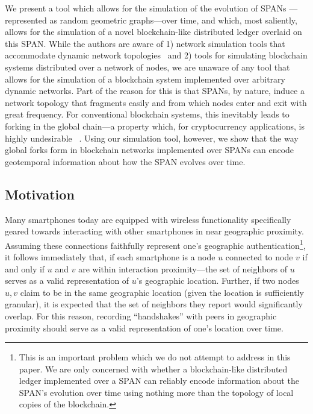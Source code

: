We present a tool which allows for the simulation of the evolution of SPANs
---represented as random geometric graphs---over time, and which, most saliently,
allows for the simulation of a novel blockchain-like distributed ledger overlaid
on this SPAN. While the authors are aware of 1) network simulation tools that
accommodate dynamic network topologies~\cite{chaudhary2012study} and
2) tools for simulating blockchain
systems distributed over a network of nodes, we are unaware of any tool that
allows for the simulation of a blockchain system implemented over arbitrary dynamic
networks. Part of the reason for this is that SPANs, by nature, induce a network topology
that fragments easily and from which nodes enter and exit with great frequency. For
conventional blockchain systems, this inevitably leads to forking in the global
chain---a property which, for cryptocurrency applications, is highly undesirable
~\cite{decker_2013,nakamoto2008bitcoin}. Using our simulation tool, however, we show
that the way global forks form in blockchain networks implemented over SPANs can encode
geotemporal information about how the SPAN evolves over time.

\subsection{Motivation}

Many smartphones today are equipped with wireless functionality specifically
geared towards interacting with other smartphones in near geographic proximity.
Assuming these connections faithfully represent one's geographic
authentication\footnote{This is an important problem which we do not attempt to
address in this paper. We are only concerned with whether a blockchain-like distributed
ledger implemented over a SPAN can reliably encode information about the SPAN's evolution
over time using nothing more than the topology of local copies of the blockchain.},
it follows immediately that, if each smartphone is a node $u$ connected to node $v$ if and only
if $u$ and $v$ are within interaction proximity---the set of neighbors of $u$ serves as
a valid representation of $u$'s geographic location. Further, if two nodes $u,v$ claim to be
in the same geographic location (given the location is sufficiently granular), it is expected
that the set of neighbors they report would significantly overlap. For this reason,
recording ``handshakes'' with peers in geographic proximity should serve as a valid
representation of one's location over time.

